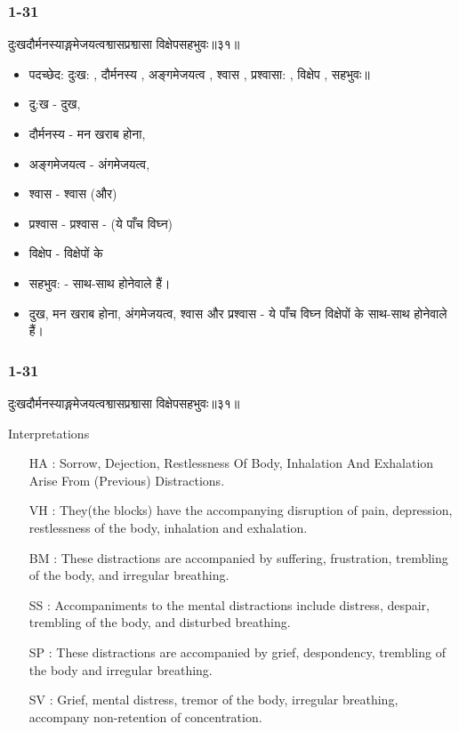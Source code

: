 \begin{frame}[fragile]\frametitle{1-31}
\begin{sanskrit}
दुःखदौर्मनस्याङ्गमेजयत्वश्वासप्रश्वासा विक्षेपसहभुवः॥३१॥
\end{sanskrit}

	\begin{itemize}
	\item पदच्छेद: दुःख: , दौर्मनस्य , अङ्गमेजयत्व , श्वास , प्रश्वासा: , विक्षेप , सहभुवः॥
	\item दु:ख - दुख,
	\item दौर्मनस्य - मन खराब होना,
	\item अङ्गमेजयत्व - अंगमेजयत्व,
	\item श्वास - श्वास (और)
	\item प्रश्वास - प्रश्वास - (ये पाँच विघ्न)
	\item विक्षेप - विक्षेपों के
	\item सहभुव: - साथ-साथ होनेवाले हैं।
	\item दुख, मन खराब होना, अंगमेजयत्व, श्वास और प्रश्वास - ये पाँच विघ्न विक्षेपों के साथ-साथ होनेवाले हैं।
	\end{itemize}
	
\end{frame}

\begin{frame}[fragile]\frametitle{1-31}
\begin{sanskrit}
दुःखदौर्मनस्याङ्गमेजयत्वश्वासप्रश्वासा विक्षेपसहभुवः॥३१॥
\end{sanskrit}

Interpretations
\begin{itemize}	
\item [HA]: Sorrow, Dejection, Restlessness Of Body, Inhalation And Exhalation Arise From (Previous) Distractions.
\item [VH]: They(the blocks) have the accompanying disruption of pain, depression, restlessness of the body, inhalation and exhalation.
\item [BM]: These distractions are accompanied by suffering, frustration, trembling of the body, and irregular breathing.
\item [SS]: Accompaniments to the mental distractions include distress, despair, trembling of the body, and disturbed breathing.
\item [SP]: These distractions are accompanied by grief, despondency, trembling of the body and irregular breathing.
\item [SV]: Grief, mental distress, tremor of the body, irregular breathing, accompany non-retention of concentration. 
\end{itemize}
	
\end{frame}

